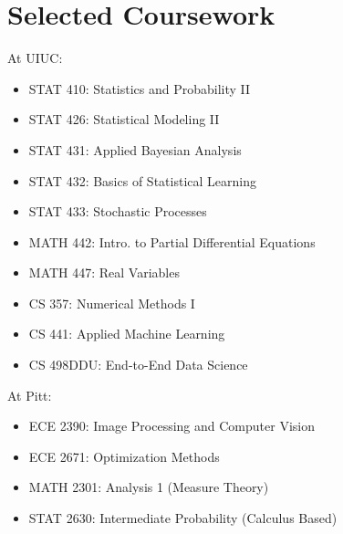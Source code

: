 \documentclass[11pt,a4paper,sans]{moderncv}
\begin{document}
\section{Selected Coursework}
At UIUC:
\begin{itemize}
    \setlength\itemindent{2.5cm}
    \item STAT 410: Statistics and Probability II
    \item STAT 426: Statistical Modeling II
    \item STAT 431: Applied Bayesian Analysis
    \item STAT 432: Basics of Statistical Learning
    \item STAT 433: Stochastic Processes
    \item MATH 442: Intro. to Partial Differential Equations
    \item MATH 447: Real Variables
    \item CS 357: Numerical Methods I
    \item CS 441: Applied Machine Learning
    \item CS 498DDU: End-to-End Data Science
\end{itemize}
At Pitt:
\begin{itemize}
    \setlength\itemindent{2.5cm}
    \item ECE 2390: Image Processing and Computer Vision
    \item ECE 2671: Optimization Methods
    \item MATH 2301: Analysis 1 (Measure Theory)
    \item STAT 2630: Intermediate Probability (Calculus Based)
\end{itemize}
\end{document}

